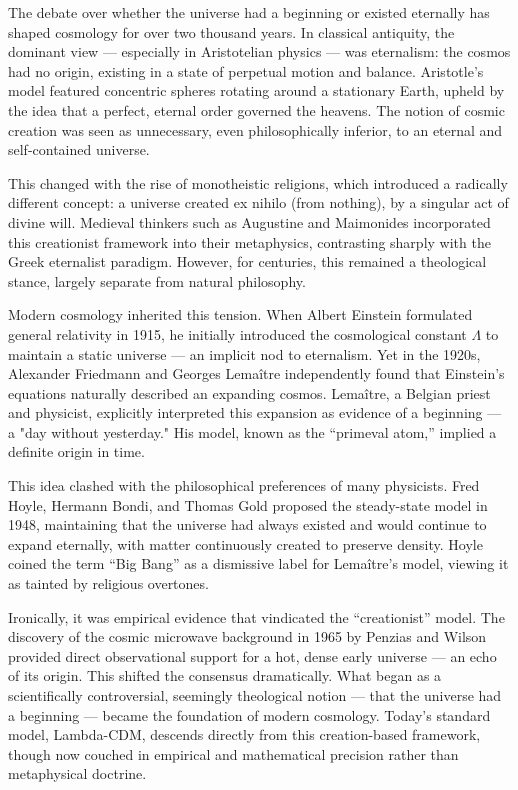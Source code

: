 \begin{historical}
The debate over whether the universe had a beginning or existed eternally has shaped cosmology for over two thousand years. In classical antiquity, the dominant view — especially in Aristotelian physics — was eternalism: the cosmos had no origin, existing in a state of perpetual motion and balance. Aristotle’s model featured concentric spheres rotating around a stationary Earth, upheld by the idea that a perfect, eternal order governed the heavens. The notion of cosmic creation was seen as unnecessary, even philosophically inferior, to an eternal and self-contained universe.

This changed with the rise of monotheistic religions, which introduced a radically different concept: a universe created ex nihilo (from nothing), by a singular act of divine will. Medieval thinkers such as Augustine and Maimonides incorporated this creationist framework into their metaphysics, contrasting sharply with the Greek eternalist paradigm. However, for centuries, this remained a theological stance, largely separate from natural philosophy.

Modern cosmology inherited this tension. When Albert Einstein formulated general relativity in 1915, he initially introduced the cosmological constant \(\Lambda\) to maintain a static universe — an implicit nod to eternalism. Yet in the 1920s, Alexander Friedmann and Georges Lemaître independently found that Einstein’s equations naturally described an expanding cosmos. Lemaître, a Belgian priest and physicist, explicitly interpreted this expansion as evidence of a beginning — a "day without yesterday." His model, known as the “primeval atom,” implied a definite origin in time.

This idea clashed with the philosophical preferences of many physicists. Fred Hoyle, Hermann Bondi, and Thomas Gold proposed the steady-state model in 1948, maintaining that the universe had always existed and would continue to expand eternally, with matter continuously created to preserve density. Hoyle coined the term “Big Bang” as a dismissive label for Lemaître’s model, viewing it as tainted by religious overtones.

Ironically, it was empirical evidence that vindicated the “creationist” model. The discovery of the cosmic microwave background in 1965 by Penzias and Wilson provided direct observational support for a hot, dense early universe — an echo of its origin. This shifted the consensus dramatically. What began as a scientifically controversial, seemingly theological notion — that the universe had a beginning — became the foundation of modern cosmology. Today’s standard model, Lambda-CDM, descends directly from this creation-based framework, though now couched in empirical and mathematical precision rather than metaphysical doctrine.
\end{historical}
